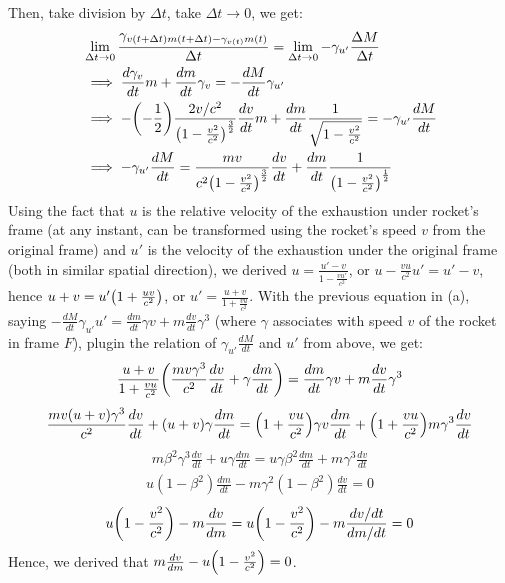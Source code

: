 \documentclass{article}
\DeclarePairedDelimiter{\paran}{(}{)}%
\begin{document}
Then, take division by $\Delta t$, take $\Delta t\rightarrow 0$, we get:
\begin{align}
    &\lim_{\Delta t\rightarrow 0}\frac{\gamma_{v(t+\Delta t)m(t+\Delta t)-\gamma_{v(t)}m(t)}}{\Delta t} = \lim_{\Delta t\rightarrow 0}-\gamma_{u'}\frac{\Delta M}{\Delta t}\\
    &\implies \frac{d\gamma_v}{dt}m + \frac{dm}{dt}\gamma_v = -\frac{dM}{dt}\gamma_{u'}\\
    &\implies -\paran*{-\frac{1}{2}}\frac{2v/c^2}{\paran*{1-\frac{v^2}{c^2}}^\frac{3}{2}}\frac{dv}{dt}m + \frac{dm}{dt}\frac{1}{\sqrt{1-\frac{v^2}{c^2}}} = -\gamma_{u'}\frac{dM}{dt}\\
    &\implies -\gamma_{u'}\frac{dM}{dt} = \frac{mv}{c^2\paran*{1-\frac{v^2}{c^2}}^\frac{3}{2}}\frac{dv}{dt} + \frac{dm}{dt}\frac{1}{\paran*{1-\frac{v^2}{c^2}}^\frac{1}{2}}
\end{align}
Using the fact that $u$ is the relative velocity of the exhaustion under rocket's frame (at any instant, can be transformed using the rocket's speed $v$ from the original frame) and $u'$ is the velocity of the exhaustion under the original frame (both in similar spatial direction), we derived $u = \frac{u'-v}{1-\frac{vu'}{c^2}}$, or $u-\frac{vu}{c^2}u' = u'-v$, hence $u+v = u'\paran*{1+\frac{uv}{c^2}}$, or $u' = \frac{u+v}{1+\frac{vu}{c^2}}$.  With the previous equation in (a), saying $-\frac{dM}{dt}\gamma_{u'}u' = \frac{dm}{dt}\gamma v+m\frac{dv}{dt}\gamma^3$ (where $\gamma$ associates with speed $v$ of the rocket in frame $F$), plugin the relation of $\gamma_{u'}\frac{dM}{dt}$ and $u'$ from above, we get:
\begin{align}
    \frac{u+v}{1+\frac{vu}{c^2}}\paran*{\frac{mv\gamma^3}{c^2}\frac{dv}{dt}+\gamma\frac{dm}{dt}} = \frac{dm}{dt}\gamma v+m\frac{dv}{dt}\gamma^3
\end{align}
\begin{align}
    \frac{mv(u+v)\gamma^3}{c^2}\frac{dv}{dt}+(u+v)\gamma\frac{dm}{dt} =\paran*{1+\frac{vu}{c^2}}\gamma v\frac{dm}{dt} + \paran*{1+\frac{vu}{c^2}}m\gamma^3\frac{dv}{dt}
\end{align}
\begin{align}
    m\beta^2\gamma^3\frac{dv}{dt}+u\gamma\frac{dm}{dt}= u\gamma\beta^2\frac{dm}{dt} + m\gamma^3\frac{dv}{dt}
\end{align}
\begin{align}
    u(1-\beta^2)\frac{dm}{dt} - m\gamma^2(1-\beta^2)\frac{dv}{dt}=0
\end{align}
\begin{align}
    u\paran*{1-\frac{v^2}{c^2}} - m\frac{dv}{dm} = u\paran*{1-\frac{v^2}{c^2}} - m\frac{dv/dt}{dm/dt} = 0
\end{align}
Hence, we derived that $m\frac{dv}{dm} - u\paran*{1-\frac{v^2}{c^2}} = 0$.
\end{document}
